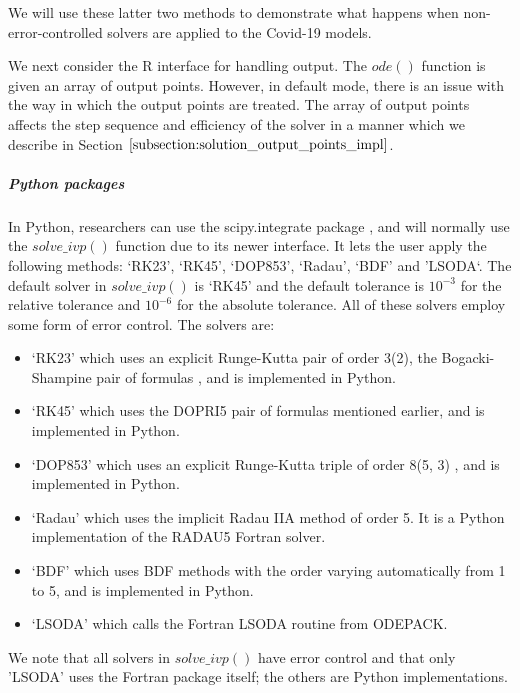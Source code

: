 We will use these latter two methods to demonstrate what happens when non-error-controlled solvers are applied to the Covid-19 models.

We next consider the R interface for handling output. The $ode()$ function is given an array of output points.  However, in default mode, there is an issue with the way in which the output points are treated. The array of output points affects the step sequence and efficiency of the solver in a manner which we describe in Section $\ref{subsection:solution_output_points_impl}$.

\subparagraph{Python packages}
In Python, researchers can use the scipy.integrate package \cite{2020SciPy-NMeth}, and will normally use the $solve\_ivp()$ function due to its newer interface. It lets the user apply the following methods: `RK23', `RK45', `DOP853', `Radau', `BDF' and 'LSODA`. The default solver in $solve\_ivp()$ is `RK45' and the default tolerance is $10^{-3}$ for the relative tolerance and $10^{-6}$ for the absolute tolerance. All of these solvers employ some form of error control. The solvers are:

\begin{itemize}
\item `RK23' which uses an explicit Runge-Kutta pair of order 3(2), the Bogacki-Shampine pair of formulas \cite{MR1025845}, and is implemented in Python.

\item `RK45' which uses the DOPRI5 pair of formulas mentioned earlier, and is implemented in Python.

\item `DOP853' which uses an explicit Runge-Kutta triple of order 8(5, 3) \cite{hairerWebsite}, and is implemented in Python.


\item `Radau' which uses the implicit Radau IIA method of order 5. It is a Python implementation of the RADAU5 Fortran solver.

\item `BDF' which uses BDF methods with the order varying automatically from 1 to 5, and is implemented in Python.


\item `LSODA' which calls the Fortran LSODA routine from ODEPACK. 
\end{itemize}

We note that all solvers in $solve\_ivp()$ have error control and that only 'LSODA' uses the Fortran package itself; the others are Python implementations.

